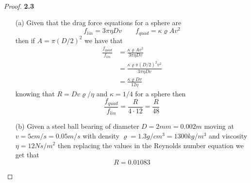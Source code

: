 \documentclass[11pt]{article}
\theoremstyle{definition}
\begin{document}
	\begin{proof}{\textbf{2.3}}
        \begin{itemize}
            \item [(a)] Given that the drag force equations for a sphere are
            $$f_{lin} = 3 \pi \eta D v \quad\quad f_{quad} = \kappa \varrho A v^2$$
            then if $A = \pi (D/2)^2$ we have that
            \begin{align*}
                \frac{f_{quad}}{f_{lin}} &= \frac{\kappa \varrho A v^2}{3 \pi \eta D v}\\
                    &= \frac{\kappa \varrho \pi (D/2)^2 v^2}{3 \pi \eta D v}\\
                    &= \frac{\kappa \varrho D v}{12 \eta}
            \end{align*}
            knowing that $R = Dv\varrho / \eta$ and $\kappa = 1/4$ for a sphere
            then
            $$\frac{f_{quad}}{f_{lin}} = \frac{R}{4 \cdot 12} = \frac{R}{48}$$

            \item [(b)] Given a steel ball bearing of diameter
            $D = 2 \si{mm} = 0.002 \si{m}$ moving at $v = 5 \si{cm/s} = 0.05 \si{m/s}$
            with density $\varrho = 1.3 \si{g/cm^3} = 1300 \si{kg/m^3}$ and
            viscosity $\eta = 12 \si{Ns/m^2}$ then replacing the values in the
            Reynolds number equation we get that
            $$R = 0.01083$$
        \end{itemize}
    \end{proof}
\end{document}
